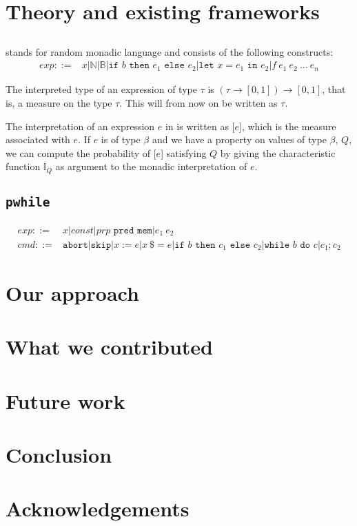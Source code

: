 \documentclass[titlepage]{article}
\begin{document}
\section{Theory and existing frameworks}\label{sec:theory}
\subsection{\rml}
\rml stands for random monadic language and consists of the following constructs:
\begin{align*}
  exp ::= & x \vert \mathbb{N} \vert \mathbb{B} \vert \texttt{if } b \texttt{ then }
  e_1 \texttt{ else } e_2 \vert \texttt{let } x = e_1 \texttt{ in } e_2 \vert
  f\ e_1\ e_2\ \dots\ e_n
\end{align*}

The interpreted type of an \rml expression of type $\tau$ is $(\tau \to [0,1]) \to [0,1]$,
that is, a measure on the type $\tau$. This will from now on be written as \M $\tau$.

The interpretation of an expression $e$ in \rml is written as [$e$], which is the
measure associated with $e$. If $e$ is of type \M $\beta$ and we have a property on
values of type $\beta$, $Q$, we can compute the probability of [$e$]
satisfying $Q$ by giving the characteristic function
$\mathbb{I}_Q$ as argument to the monadic interpretation of $e$. 


\subsection{\texttt{pwhile}}

\begin{align*}
  exp ::= & x \vert const \vert prp \texttt{ pred mem} \vert e_1\ e_2\\
  cmd ::= & \texttt{abort} \vert \texttt{skip} \vert x := e \vert x\ \$= e \vert
            \texttt{if } b \texttt{ then } c_1 \texttt{ else } c_2 \vert
            \texttt{while } b \texttt{ do } c \vert c_1 ; c_2
\end{align*}


\section{Our approach}\label{sec:approach}


\section{What we contributed}\label{sec:contrib}


\section{Future work}\label{sec:future}


\section{Conclusion}\label{sec:conclusion}

\section{Acknowledgements}\label{sec:ack}
\end{document}
